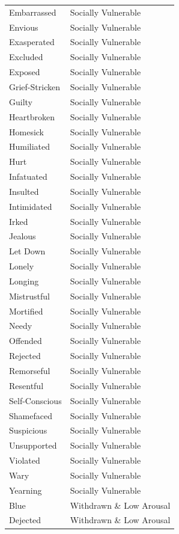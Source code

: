 \begin{longtable}{p{}p{}}
Embarrassed & Socially Vulnerable \\
Envious & Socially Vulnerable \\
Exasperated & Socially Vulnerable \\
Excluded & Socially Vulnerable \\
Exposed & Socially Vulnerable \\
Grief-Stricken & Socially Vulnerable \\
Guilty & Socially Vulnerable \\
Heartbroken & Socially Vulnerable \\
Homesick & Socially Vulnerable \\
Humiliated & Socially Vulnerable \\
Hurt & Socially Vulnerable \\
Infatuated & Socially Vulnerable \\
Insulted & Socially Vulnerable \\
Intimidated & Socially Vulnerable \\
Irked & Socially Vulnerable \\
Jealous & Socially Vulnerable \\
Let Down & Socially Vulnerable \\
Lonely & Socially Vulnerable \\
Longing & Socially Vulnerable \\
Mistrustful & Socially Vulnerable \\
Mortified & Socially Vulnerable \\
Needy & Socially Vulnerable \\
Offended & Socially Vulnerable \\
Rejected & Socially Vulnerable \\
Remorseful & Socially Vulnerable \\
Resentful & Socially Vulnerable \\
Self-Conscious & Socially Vulnerable \\
Shamefaced & Socially Vulnerable \\
Suspicious & Socially Vulnerable \\
Unsupported & Socially Vulnerable \\
Violated & Socially Vulnerable \\
Wary & Socially Vulnerable \\
Yearning & Socially Vulnerable \\
Blue & Withdrawn \& Low Arousal \\
Dejected & Withdrawn \& Low Arousal \\

\end{longtable}
